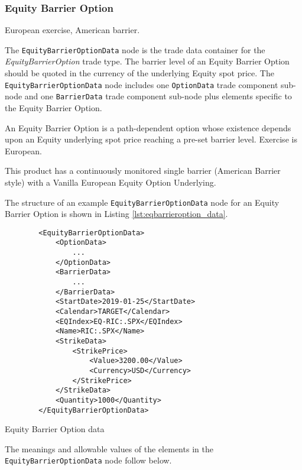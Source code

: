 \subsubsection{Equity Barrier Option}

European exercise, American barrier.

The \lstinline!EquityBarrierOptionData!  node is the trade data container for the \emph{EquityBarrierOption} trade type. The barrier level of an Equity Barrier Option should be quoted in the currency of 
the underlying Equity spot price. The \lstinline!EquityBarrierOptionData!  node includes one  \lstinline!OptionData! trade component sub-node and one \lstinline!BarrierData! trade component sub-node plus elements
specific to the Equity Barrier Option. 

An Equity Barrier Option is a path-dependent option whose existence depends upon an Equity underlying
spot price reaching a pre-set barrier level. Exercise is European.

This product has a continuously monitored single barrier (American Barrier style) with a Vanilla European Equity
Option Underlying.

The structure of an example \lstinline!EquityBarrierOptionData! node for an Equity Barrier Option is shown in Listing
\ref{lst:eqbarrieroption_data}.

\begin{listing}[H]
\begin{verbatim}
        <EquityBarrierOptionData>
            <OptionData>
                ...
            </OptionData>
            <BarrierData>
                ...
            </BarrierData>
            <StartDate>2019-01-25</StartDate>
            <Calendar>TARGET</Calendar>
            <EQIndex>EQ-RIC:.SPX</EQIndex>            
            <Name>RIC:.SPX</Name>
            <StrikeData>
				<StrikePrice>
					<Value>3200.00</Value>
					<Currency>USD</Currency>
				</StrikePrice>
            </StrikeData>
            <Quantity>1000</Quantity>
        </EquityBarrierOptionData>
\end{verbatim}
\caption{Equity Barrier Option data}
\label{lst:eqbarrieroption_data}
\end{listing}

The meanings and allowable values of the elements in the \lstinline!EquityBarrierOptionData!  node follow below.

